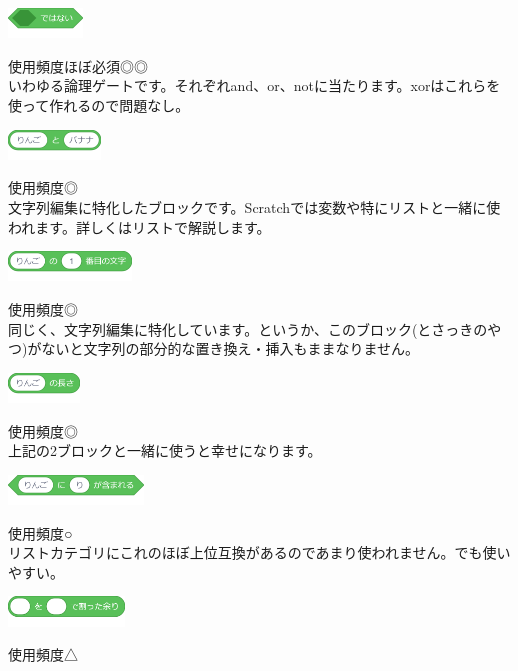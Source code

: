 \documentclass[b5paper,10pt]{jsarticle}
\begin{document}
\begin{multicols*}{3}
\begin{itembox}{5}
\includegraphics[height=8mm]{images/operators_11.png}
\end{itembox}
使用頻度ほぼ必須◎◎\\
いわゆる論理ゲートです。それぞれand、or、notに当たります。xorはこれらを使って作れるので問題なし。
\begin{itembox}{6}
\includegraphics[height=8mm]{images/operators_12.png}
\end{itembox}
使用頻度◎\\
文字列編集に特化したブロックです。Scratchでは変数や特にリストと一緒に使われます。詳しくはリストで解説します。
\begin{itembox}{7}
\includegraphics[height=8mm]{images/operators_13.png}
\end{itembox}
使用頻度◎\\
同じく、文字列編集に特化しています。というか、このブロック(とさっきのやつ)がないと文字列の部分的な置き換え・挿入もままなりません。
\begin{itembox}{8}
\includegraphics[height=8mm]{images/operators_14.png}
\end{itembox}
使用頻度◎\\
上記の2ブロックと一緒に使うと幸せになります。
\begin{itembox}{9}
\includegraphics[height=8mm]{images/operators_15.png}
\end{itembox}
使用頻度○\\
リストカテゴリにこれのほぼ上位互換があるのであまり使われません。でも使いやすい。
\begin{itembox}{10}
\includegraphics[height=8mm]{images/operators_16.png}
\end{itembox}
使用頻度△\\

\end{multicols*}
\end{document}
